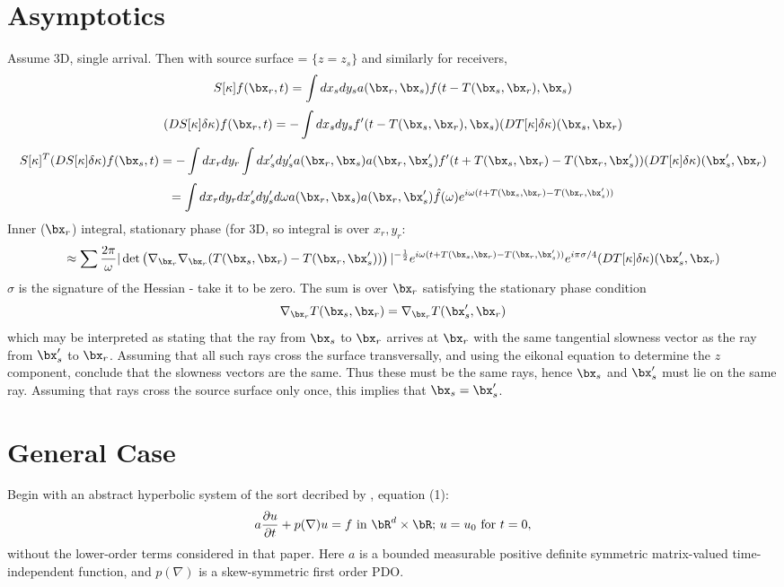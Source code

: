 \section{Asymptotics}
Assume 3D, single arrival. Then with source surface = $\{z=z_s\}$ and
similarly for receivers,
\[
S[\kappa]f(\bx_r,t) = \int dx_sdy_s a(\bx_r,\bx_s)
f(t-T(\bx_s,\bx_r),\bx_s)
\]
\[
(DS[\kappa]\delta \kappa)f(\bx_r,t) = -\int dx_sdy_s f'(t-T(\bx_s,\bx_r),\bx_s)
(DT[\kappa]\delta \kappa)(\bx_s,\bx_r)
\]
\[
S[\kappa]^T(DS[\kappa]\delta \kappa)f(\bx_s,t) = -\int dx_r dy_r \int
dx'_s dy'_s a(\bx_r,\bx_s) a(\bx_r,\bx'_s) f'(t+T(\bx_s,\bx_r) -
T(\bx_r,\bx'_s)) (DT[\kappa]\delta \kappa)(\bx_s',\bx_r)
\]
\[
=\int dx_r dy_r dx'_s dy'_s d\omega  a(\bx_r,\bx_s) a(\bx_r,\bx'_s) \hat{f}(\omega)e^{i\omega(t +T(\bx_s,\bx_r) -T(\bx_r,\bx'_s))}
\]
Inner ($\bx_r$) integral, stationary phase (for 3D, so integral is
over $x_r,y_r$:
\[
\approx
\sum
\frac{2\pi}{\omega}|\det\left(\nabla_{\bx_r}\nabla_{\bx_r}(T(\bx_s,\bx_r)-T(\bx_r,\bx_s'))\right)|^{-\frac{1}{2}}
  e^{i\omega(t +T(\bx_s,\bx_r) -T(\bx_r,\bx'_s))} e^{i\pi\sigma/4}(DT[\kappa]\delta \kappa)(\bx_s',\bx_r)
\]
$\sigma$ is the signature of the Hessian - take it to be zero. The sum is over $\bx_r$ satisfying the stationary phase condition
\[
\nabla_{\bx_r} T(\bx_s,\bx_r) = \nabla_{\bx_r}T(\bx'_s,\bx_r)
\]
which may be interpreted as stating that the ray from $\bx_s$ to
$\bx_r$ arrives at $\bx_r$ with the same tangential slowness vector as the ray
from $\bx_s'$ to $\bx_r$. Assuming that all such rays cross the
surface transversally, and using the eikonal equation to determine the
$z$ component, conclude that the slowness vectors are the same. Thus
these must be the same rays, hence $\bx_s$ and $\bx'_s$ must lie on
the same ray. Assuming that rays cross the source surface only once,
this implies that $\bx_s=\bx_s'$. 
\section{General Case}
Begin with an abstract hyperbolic system of the sort decribed by
\cite{BlazekStolkSymes:13}, equation (1):
\begin{equation}
\label{symmhyp}
a \frac{\partial u}{\partial t} + p(\nabla) u  = f\mbox{ in } \bR^d \times \bR; \, u = u_0 \mbox{ for } t = 0,
\end{equation}
without the lower-order terms considered in that paper. Here $a$ is a
bounded measurable positive definite symmetric matrix-valued time-independent function, and $p(\nabla)$ is
a skew-symmetric first order PDO. 


